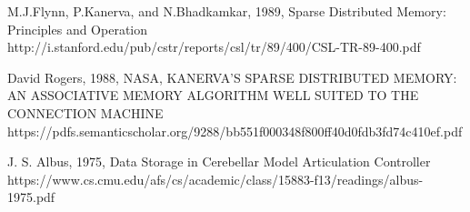 \documentclass[10pt,a4paper]{article}
\begin{document}
\newpage



\begin{thebibliography}{4}

 M.J.Flynn, P.Kanerva, and N.Bhadkamkar, 1989, Sparse Distributed Memory: Principles and Operation
http://i.stanford.edu/pub/cstr/reports/csl/tr/89/400/CSL-TR-89-400.pdf

 David Rogers, 1988, NASA, KANERVA’S SPARSE DISTRIBUTED MEMORY: AN ASSOCIATIVE MEMORY ALGORITHM WELL SUITED TO THE CONNECTION MACHINE
https://pdfs.semanticscholar.org/9288/bb551f000348f800ff40d0fdb3fd74c410ef.pdf

 J. S. Albus, 1975, Data Storage in Cerebellar Model Articulation Controller
https://www.cs.cmu.edu/afs/cs/academic/class/15883-f13/readings/albus-1975.pdf

\end{thebibliography}
\end{document}
